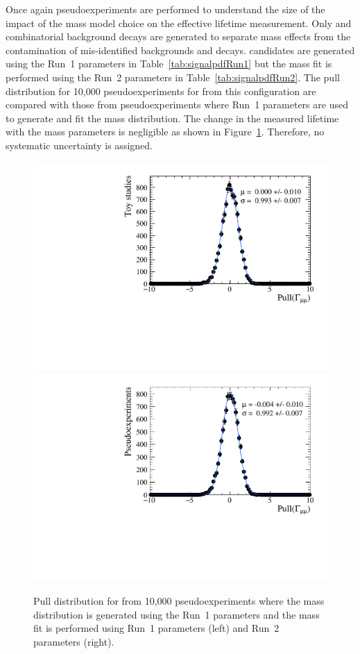 Once again pseudoexperiments are performed to understand the size of the impact of the mass model choice on the effective lifetime measurement. Only \bsmumu and combinatorial background decays are generated to separate mass \pdf effects from the contamination of mis-identified backgrounds and \bdmumu decays. \bsmumu candidates are generated using the Run~1 parameters in Table~\ref{tab:signalpdfRun1} but the mass fit is performed using the Run~2 parameters in Table~\ref{tab:signalpdfRun2}. The pull distribution for 10,000 pseudoexperiments for \Gmumu from this configuration are compared with those from pseudoexperiments where Run~1 parameters are used to generate and fit the mass distribution. The change in the measured lifetime with the mass \pdf parameters is negligible as shown in Figure~\ref{fig:masspdfsyst}. Therefore, no systematic uncertainty is assigned. 

\begin{figure}[tbp]
    \centering
        \includegraphics[width=0.49 \textwidth]{./Figs/LifetimeSystematics/Gamma_pull_mass_pdf_Run1.pdf}
        \includegraphics[width=0.49 \textwidth]{./Figs/LifetimeSystematics/Gamma_pull_mass_pdf_Run2.pdf}
    \caption{Pull distribution for \Gmumu from 10,000 pseudoexperiments where the \bsmumu mass distribution is generated using the Run~1 parameters and the mass fit is performed using Run~1 parameters (left) and Run~2 parameters (right).}
    \label{fig:masspdfsyst}
\end{figure}



